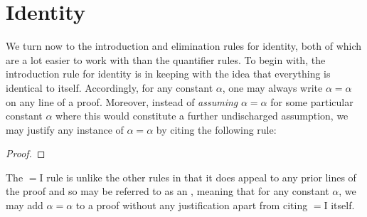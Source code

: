 






\section{Identity}

We turn now to the introduction and elimination rules for identity, both of which are a lot easier to work with than the quantifier rules.
To begin with, the introduction rule for identity is in keeping with the idea that everything is identical to itself.
Accordingly, for any constant $\alpha$, one may always write $\alpha = \alpha$ on any line of a proof.
Moreover, instead of \textit{assuming} $\alpha = \alpha$ for some particular constant $\alpha$ where this would constitute a further undischarged assumption, we may justify any instance of $\alpha = \alpha$ by citing the following rule: 

\begin{proof}
   
\end{proof}

The $=$I rule is unlike the other rules in that it does appeal to any prior lines of the proof and so may be referred to as an , meaning that for any constant $\alpha$, we may add $\alpha=\alpha$ to a proof without any justification apart from citing $=$I itself. 

